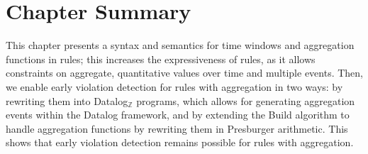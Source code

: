 

\section{Chapter Summary}
\label{section:aggregation-summary}

This chapter presents a syntax and semantics for time windows and
aggregation functions in rules;
this increases the expressiveness of rules,
as it allows constraints
on aggregate, quantitative values
over time and multiple events.
Then, we enable early violation detection for rules with aggregation in two ways:
by rewriting them into Datalog$_{\mathbb{Z}}$ programs,
which allows for generating aggregation events
within the Datalog framework,
and by extending the {\sf Build} algorithm to handle aggregation functions by rewriting them in Presburger arithmetic.
This shows that early violation detection remains possible
for rules with aggregation.
